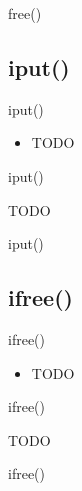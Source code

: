 \documentclass{beamer}
\begin{document}
\begin{frame}{free()}
\end{frame}




\subsection{iput()}

\begin{frame}{iput()}
    \begin{itemize}
        \item TODO
    \end{itemize}
\end{frame}

\begin{frame}{iput()}
    \begin{algorithmic}[1]
        \State TODO
    \end{algorithmic}
\end{frame}

\begin{frame}{iput()}
\end{frame}




\subsection{ifree()}

\begin{frame}{ifree()}
    \begin{itemize}
        \item TODO
    \end{itemize}
\end{frame}

\begin{frame}{ifree()}
    \begin{algorithmic}[1]
        \State TODO
    \end{algorithmic}
\end{frame}

\begin{frame}{ifree()}
\end{frame}


\end{document}
